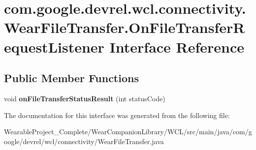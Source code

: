 \hypertarget{interfacecom_1_1google_1_1devrel_1_1wcl_1_1connectivity_1_1WearFileTransfer_1_1OnFileTransferRequestListener}{}\section{com.\+google.\+devrel.\+wcl.\+connectivity.\+Wear\+File\+Transfer.\+On\+File\+Transfer\+Request\+Listener Interface Reference}
\label{interfacecom_1_1google_1_1devrel_1_1wcl_1_1connectivity_1_1WearFileTransfer_1_1OnFileTransferRequestListener}
\subsection*{Public Member Functions}
\begin{DoxyCompactItemize}
\item 
void {\bfseries on\+File\+Transfer\+Status\+Result} (int status\+Code)\hypertarget{interfacecom_1_1google_1_1devrel_1_1wcl_1_1connectivity_1_1WearFileTransfer_1_1OnFileTransferRequestListener_a498dc9e8a1e4f483df66937251ede606}{}\label{interfacecom_1_1google_1_1devrel_1_1wcl_1_1connectivity_1_1WearFileTransfer_1_1OnFileTransferRequestListener_a498dc9e8a1e4f483df66937251ede606}

\end{DoxyCompactItemize}


The documentation for this interface was generated from the following file\+:\begin{DoxyCompactItemize}
\item 
Wearable\+Project\+\_\+\+Complete/\+Wear\+Companion\+Library/\+W\+C\+L/src/main/java/com/google/devrel/wcl/connectivity/Wear\+File\+Transfer.\+java\end{DoxyCompactItemize}
